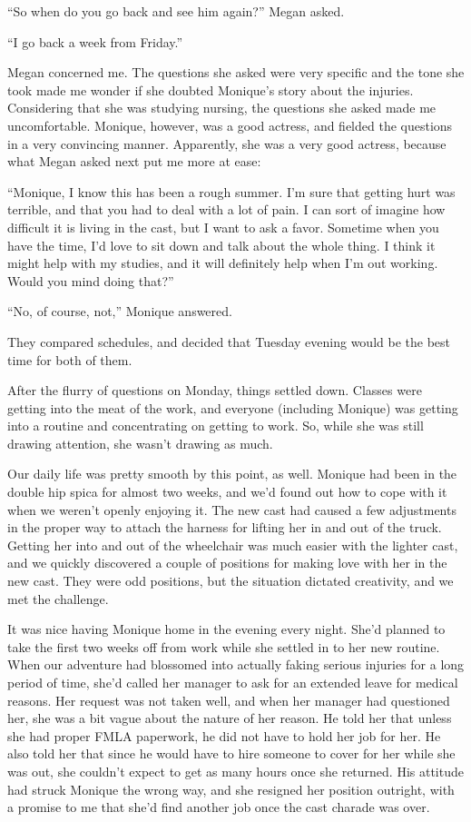 ``So when do you go back and see him again?'' Megan asked.

``I go back a week from Friday.''

Megan concerned me. The questions she asked were very specific and the tone she took made
me wonder if she doubted Monique's story about the injuries. Considering that she was studying
nursing, the questions she asked made me uncomfortable. Monique, however, was a good actress,
and fielded the questions in a very convincing manner. Apparently, she was a very good actress,
because what Megan asked next put me more at ease:

``Monique, I know this has been a rough summer. I'm sure that getting hurt was terrible,
and that you had to deal with a lot of pain. I can sort of imagine how difficult it is living in
the cast, but I want to ask a favor. Sometime when you have the time, I'd love to sit down and
talk about the whole thing. I think it might help with my studies, and it will definitely help
when I'm out working. Would you mind doing that?''

``No, of course, not,'' Monique answered.

They compared schedules, and decided that Tuesday evening would be the best time for both
of them.

After the flurry of questions on Monday, things settled down. Classes were getting into the
meat of the work, and everyone (including Monique) was getting into a routine and concentrating
on getting to work. So, while she was still drawing attention, she wasn't drawing as much.

Our daily life was pretty smooth by this point, as well. Monique had been in the double hip
spica for almost two weeks, and we'd found out how to cope with it when we weren't openly
enjoying it. The new cast had caused a few adjustments in the proper way to attach the harness
for lifting her in and out of the truck. Getting her into and out of the wheelchair was much
easier with the lighter cast, and we quickly discovered a couple of positions for making love
with her in the new cast. They were odd positions, but the situation dictated creativity, and we
met the challenge.

It was nice having Monique home in the evening every night. She'd planned to take the first
two weeks off from work while she settled in to her new routine. When our adventure had
blossomed into actually faking serious injuries for a long period of time, she'd called her
manager to ask for an extended leave for medical reasons. Her request was not taken well, and
when her manager had questioned her, she was a bit vague about the nature of her reason. He told
her that unless she had proper FMLA paperwork, he did not have to hold her job for her. He also
told her that since he would have to hire someone to cover for her while she was out, she
couldn't expect to get as many hours once she returned. His attitude had struck Monique the
wrong way, and she resigned her position outright, with a promise to me that she'd find another
job once the cast charade was over.


